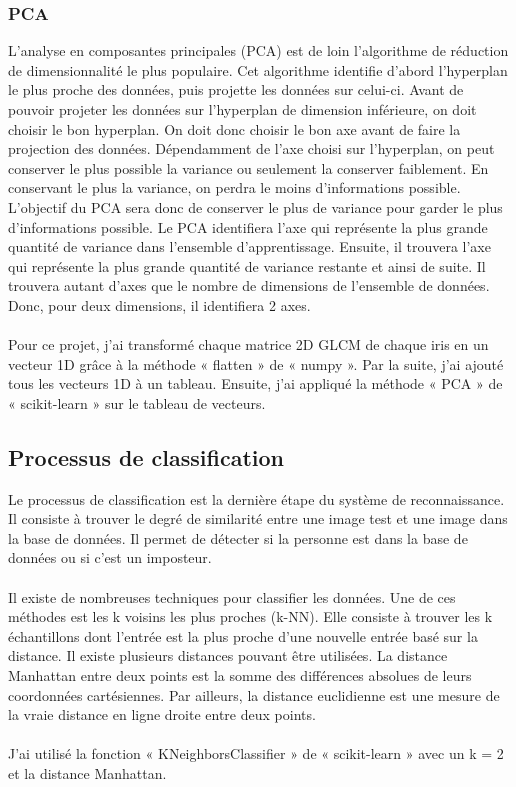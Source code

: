 \documentclass[12pt,twoside,letterpaper]{article}
\begin{document}
\subsubsection{PCA}
L'analyse en composantes principales (PCA) est de loin l'algorithme de réduction de dimensionnalité le plus populaire. Cet algorithme identifie d'abord l'hyperplan le plus proche des données, puis projette les données sur celui-ci. Avant de pouvoir projeter les données sur l’hyperplan de dimension inférieure, on doit choisir le bon hyperplan. On doit donc choisir le bon axe avant de faire la projection des données. Dépendamment de l’axe choisi sur l’hyperplan, on peut conserver le plus possible la variance ou seulement la conserver faiblement. En conservant le plus la variance, on perdra le moins d’informations possible. L’objectif du PCA sera donc de conserver le plus de variance pour garder le plus d’informations possible. Le PCA identifiera l’axe qui représente la plus grande quantité de variance dans l'ensemble d'apprentissage. Ensuite, il trouvera l’axe qui représente la plus grande quantité de variance restante et ainsi de suite. Il trouvera autant d’axes que le nombre de dimensions de l’ensemble de données. Donc, pour deux dimensions, il identifiera 2 axes.
\cite{ref_03}
\\~\\
Pour ce projet, j'ai transformé chaque matrice 2D GLCM de chaque iris en un vecteur 1D grâce à la méthode « flatten » de « numpy ». Par la suite, j'ai ajouté tous les vecteurs 1D à un tableau.  Ensuite, j'ai appliqué la méthode « PCA » de « scikit-learn » sur le tableau de vecteurs.

\subsection{Processus de classification}
Le processus de classification est la dernière étape du système de reconnaissance. Il consiste à trouver le degré de similarité entre une image test et une image dans la base de données. Il permet de détecter si la personne est dans la base de données ou si c’est un imposteur.\cite{ref_01}\cite{ref_06}
\\~\\
Il existe de nombreuses techniques pour classifier les données. Une de ces méthodes est les k voisins les plus proches (k-NN). Elle consiste à trouver les k échantillons dont l'entrée est la plus proche d'une nouvelle entrée basé sur la distance. Il existe plusieurs distances pouvant être utilisées. La distance Manhattan entre deux points est la somme des différences absolues de leurs coordonnées cartésiennes. Par ailleurs, la distance euclidienne est une mesure de la vraie distance en ligne droite entre deux points.\cite{ref_11}
\\~\\
J'ai utilisé la fonction « KNeighborsClassifier » de « scikit-learn » avec un k = 2 et la distance Manhattan.
\end{document}
